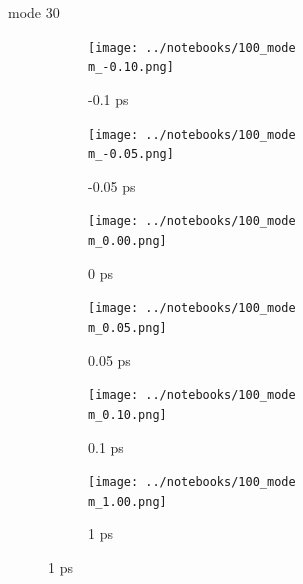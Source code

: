 \documentclass{beamer}
\begin{document}
\renewcommand\m{30}
\begin{frame}{mode \m}
	\begin{figure}
		\centering
		\begin{subfigure}[b]{\w\textwidth}
			\centering
			\texttt{[image: ../notebooks/100\_mode\\m\_-0.10.png]}
			\caption{-0.1 ps}
		\end{subfigure}
		\begin{subfigure}[b]{\w\textwidth}
			\centering
			\texttt{[image: ../notebooks/100\_mode\\m\_-0.05.png]}
			\caption{-0.05 ps}
		\end{subfigure}
		\begin{subfigure}[b]{\w\textwidth}
			\centering
			\texttt{[image: ../notebooks/100\_mode\\m\_0.00.png]}
			\caption{0 ps}
		\end{subfigure}
		\begin{subfigure}[b]{\w\textwidth}
			\centering
			\texttt{[image: ../notebooks/100\_mode\\m\_0.05.png]}
			\caption{0.05 ps}
		\end{subfigure}
		\begin{subfigure}[b]{\w\textwidth}
			\centering
			\texttt{[image: ../notebooks/100\_mode\\m\_0.10.png]}
			\caption{0.1 ps}
		\end{subfigure}
		\begin{subfigure}[b]{\w\textwidth}
			\centering
			\texttt{[image: ../notebooks/100\_mode\\m\_1.00.png]}
			\caption{1 ps}
		\end{subfigure}
	\end{figure}
\end{frame}
\end{document}
